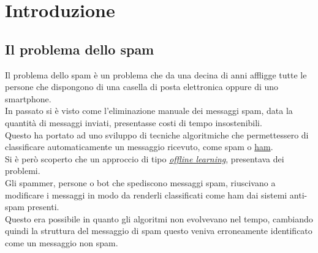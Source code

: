 \newpage
\section{Introduzione}

\subsection{Il problema dello spam}
Il problema dello spam è un problema che da una decina di anni affligge tutte le persone che dispongono di una casella di posta elettronica oppure di uno smartphone.\\
In passato si è visto come l'eliminazione manuale dei messaggi spam, data la quantità di messaggi inviati, presentasse costi di tempo insostenibili.\\
Questo ha portato ad uno sviluppo di tecniche algoritmiche che permettessero di classificare automaticamente un messaggio ricevuto, come spam o \href{https://en.wiktionary.org/wiki/ham_e-mail}{ham}.\\
Si è però scoperto che un approccio di tipo \href{https://en.wikipedia.org/wiki/Offline_learning}{\textit{offline learning}}, presentava dei problemi.\\
Gli spammer, persone o bot che spediscono messaggi spam, riuscivano a modificare i messaggi in modo da renderli classificati come ham dai sistemi anti-spam presenti.\\
Questo era possibile in quanto gli algoritmi non evolvevano nel tempo, cambiando quindi la struttura del messaggio di spam questo veniva erroneamente identificato come un messaggio non spam.\\
